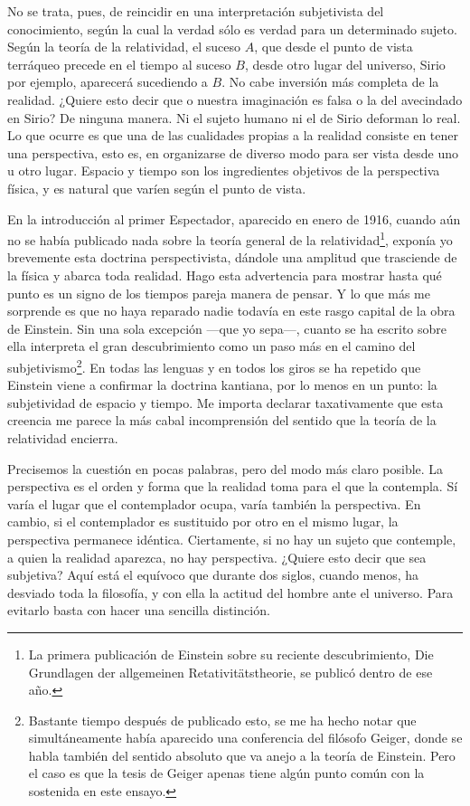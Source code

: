 \documentclass[a4paper, 12pt]{article}
\begin{document}
No se trata, pues, de reincidir en una interpretación subjetivista del
conocimiento, según la cual la verdad sólo es verdad para un determinado
sujeto. Según la teoría de la relatividad, el suceso $A$, que desde el punto
de vista terráqueo precede en el tiempo al suceso $B$, desde otro lugar del
universo, Sirio por ejemplo, aparecerá sucediendo a $B$. No cabe inversión
más completa de la realidad. ¿Quiere esto decir que o nuestra imaginación
es falsa o la del avecindado en Sirio? De ninguna manera. Ni el sujeto
humano ni el de Sirio deforman lo real. Lo que ocurre es que una de las
cualidades propias a la realidad consiste en tener una perspectiva, esto
es, en organizarse de diverso modo para ser vista desde uno u otro lugar.
Espacio y tiempo son los ingredientes objetivos de la perspectiva física,
y es natural que varíen según el punto de vista.

En la introducción al primer Espectador, aparecido en enero de 1916,
cuando aún no se había publicado nada sobre la teoría general de la
relatividad\footnote{La primera publicación de Einstein sobre su reciente descubrimiento,
Die Grundlagen der allgemeinen Retativitätstheorie, se publicó dentro de
ese año.}, exponía yo brevemente esta doctrina perspectivista,
dándole una amplitud que trasciende de la física y abarca toda realidad.
Hago esta advertencia para mostrar hasta qué punto es un signo de los
tiempos pareja manera de pensar.
Y lo que más me sorprende es que no haya reparado nadie todavía en este
rasgo capital de la obra de Einstein. Sin una sola excepción ---que yo
sepa---, cuanto se ha escrito sobre ella interpreta el gran descubrimiento
como un paso más en el camino del subjetivismo\footnote{Bastante tiempo después de publicado esto, se me ha hecho notar que
simultáneamente había aparecido una conferencia del filósofo Geiger, donde
se habla también del sentido absoluto que va anejo a la teoría de
Einstein. Pero el caso es que la tesis de Geiger apenas tiene algún punto
común con la sostenida en este ensayo.}. En todas las lenguas y
en todos los giros se ha repetido que Einstein viene a confirmar la
doctrina kantiana, por lo menos en un punto: la subjetividad de espacio y
tiempo. Me importa declarar taxativamente que esta creencia me parece la
más cabal incomprensión del sentido que la teoría de la relatividad
encierra.


Precisemos la cuestión en pocas palabras, pero del modo más claro posible.
La perspectiva es el orden y forma que la realidad toma para el que la
contempla. Sí varía el lugar que el contemplador ocupa, varía también la
perspectiva. En cambio, si el contemplador es sustituido por otro en el
mismo lugar, la perspectiva permanece idéntica. Ciertamente, si no hay un
sujeto que contemple, a quien la realidad aparezca, no hay perspectiva.
¿Quiere esto decir que sea subjetiva? Aquí está el equívoco que durante
dos siglos, cuando menos, ha desviado toda la filosofía, y con ella la
actitud del hombre ante el universo. Para evitarlo basta con hacer una
sencilla distinción.
\end{document}
